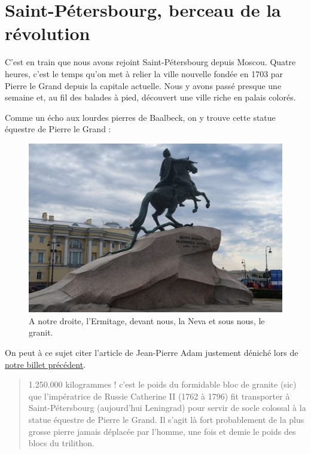 \hypertarget{saint-puxe9tersbourg-berceau-de-la-ruxe9volution}{%
\section{Saint-Pétersbourg, berceau de la
révolution}\label{saint-puxe9tersbourg-berceau-de-la-ruxe9volution}}

C'est en train que nous avons rejoint Saint-Pétersbourg depuis Moscou.
Quatre heures, c'est le temps qu'on met à relier la ville nouvelle
fondée en 1703 par Pierre le Grand depuis la capitale actuelle. Nous y
avons passé presque une semaine et, au fil des balades à pied, découvert
une ville riche en palais colorés.

Comme un écho aux lourdes pierres de Baalbeck, on y trouve cette statue
équestre de Pierre le Grand :

\begin{figure}
\centering
\includegraphics{images/20180606_pierre.JPG}
\caption{A notre droite, l'Ermitage, devant nous, la Neva et sous nous,
le granit.}
\end{figure}

On peut à ce sujet citer l'article de Jean-Pierre Adam justement déniché
lors de \href{/au-revoir-liban.html}{notre billet précédent}.

\begin{quote}
1.250.000 kilogrammes ! c'est le poids du formidable bloc de granite
(sic) que l'impératrice de Russie Catherine II (1762 à 1796) fit
transporter à Saint-Pétersbourg (aujourd'hui Leningrad) pour servir de
socle colossal à la statue équestre de Pierre le Grand. Il s'agit là
fort probablement de la plus grosse pierre jamais déplacée par l'homme,
une fois et demie le poids des blocs du trilithon.
\end{quote}

